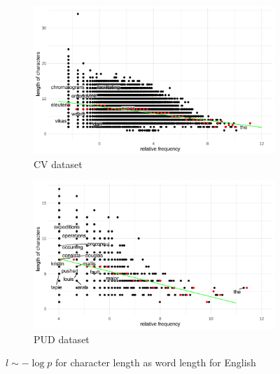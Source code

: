 \begin{figure}[H]
  \centering
  \begin{subfigure}[b]{0.48\textwidth}
    \centering
    \includegraphics[width=\textwidth]{plots/English_logp_cl_CV.pdf}
    \caption{CV dataset}
  \end{subfigure}
  \hfill
  \begin{subfigure}[b]{0.48\textwidth}
    \centering
    \includegraphics[width=\textwidth]{plots/English_logp_cl_PUD.pdf}
    \caption{PUD dataset}
  \end{subfigure}
  \caption{$l \sim -\log p$ for character length as word length for English}
\end{figure}
